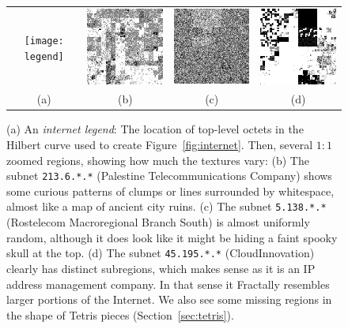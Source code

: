 \documentclass[twocolumn]{article}
\begin{document}
\begin{figure}[htp]
  \centering
  \noindent
  \begin{tabular}{@{}cccc@{}}
    \texttt{[image: legend]} &
    \includegraphics[width=1.66in]{subnet213_6} &
    \includegraphics[width=1.66in]{subnet5_138} &
    \includegraphics[width=1.66in]{subnet45_195} \\
    (a) & (b) & (c) & (d) \\
  \end{tabular}
  \caption{
    (a) An {\em internet legend}: The location of top-level octets in the
    Hilbert curve used to create Figure~\ref{fig:internet}. Then, several
    $1\!:\!1$ zoomed regions, showing how much the textures vary:
    (b) The subnet {\tt 213.6.*.*} (Palestine Telecommunications Company) shows
    some curious patterns of clumps or lines surrounded by whitespace, almost
    like a map of ancient city ruins.
    (c) The subnet {\tt 5.138.*.*} (Rostelecom Macroregional Branch South) is
    almost uniformly random, although it does look like it might
    be hiding a faint spooky skull at the top.
    (d) The subnet {\tt 45.195.*.*} (CloudInnovation) clearly has
    distinct subregions, which makes sense as it is an IP address
    management company. In that sense it Fractally resembles larger
    portions of the Internet. We also see some missing regions in the
    shape of Tetris pieces (Section~\ref{sec:tetris}).
  } \label{fig:internetlegend}
\end{figure}
\end{document}
